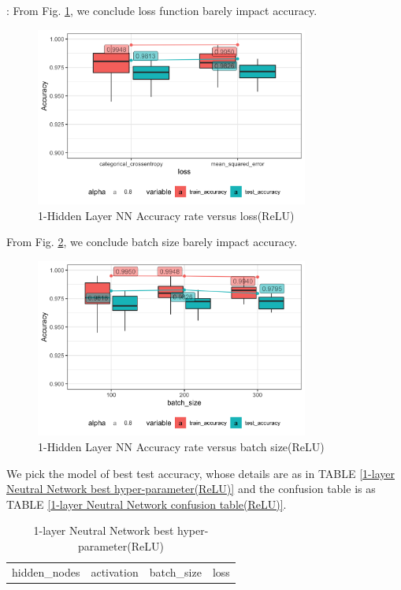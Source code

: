 \documentclass[8pt]{beamer}
\begin{document}
\begin{frame}[allowframebreaks]{\secname : \subsecname}{\subsubsecname}
From Fig. \ref{1-Hidden Layer Neural Network Accuracy rate versus loss(ReLU)}, we conclude loss function barely impact accuracy.
\begin{figure}[htbp]
\centerline{\includegraphics[width=0.8\textwidth]{figure/91-Hidden Layer Neural Network Accuracy rate versus loss.png}}
\caption{1-Hidden Layer NN Accuracy rate versus loss(ReLU)}
\label{1-Hidden Layer Neural Network Accuracy rate versus loss(ReLU)}
\vspace{-1.5em}
\end{figure}

From Fig. \ref{1-Hidden Layer Neural Network Accuracy rate versus batch size(ReLU)}, we conclude batch size barely impact accuracy.
\begin{figure}[htbp]
\centerline{\includegraphics[width=0.8\textwidth]{figure/91-Hidden Layer Neural Network Accuracy rate versus batch_size.png}}
\caption{1-Hidden Layer NN Accuracy rate versus batch size(ReLU)}
\label{1-Hidden Layer Neural Network Accuracy rate versus batch size(ReLU)}
\vspace{-1.5em}
\end{figure}



We pick the model of best test accuracy, whose details are as in TABLE \ref{1-layer Neutral Network best hyper-parameter(ReLU)} and the confusion table is as TABLE \ref{1-layer Neutral Network confusion table(ReLU)}.
\begin{table}[htbp]
\tiny
\centering
\caption{1-layer Neutral Network best hyper-parameter(ReLU)}
\begin{tabular}{|c|c|c|c|}
  \hline
 hidden\_nodes & activation & batch\_size & loss \\


\end{tabular}
\end{table}
\end{frame}
\end{document}

